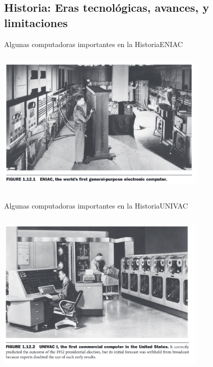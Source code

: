 \documentclass[aspectratio=169,compress]{beamer}
\begin{document}


\subsection{Historia: Eras tecnológicas, avances, y limitaciones}

\begin{frame} {Algunas computadoras importantes en la Historia}{ENIAC} 

    \begin{columns}[onlytextwidth,T]
      \column{\dimexpr\linewidth-50mm-5mm}


    \includegraphics[width=100mm]{images/eniac.png}


    \end{columns}

\end{frame}





\begin{frame} {Algunas computadoras importantes en la Historia}{UNIVAC} 

    \begin{columns}[onlytextwidth,T]
      \column{\dimexpr\linewidth-50mm-5mm}


    \includegraphics[width=100mm]{images/univac.png}


    \end{columns}

\end{frame}
\end{document}
